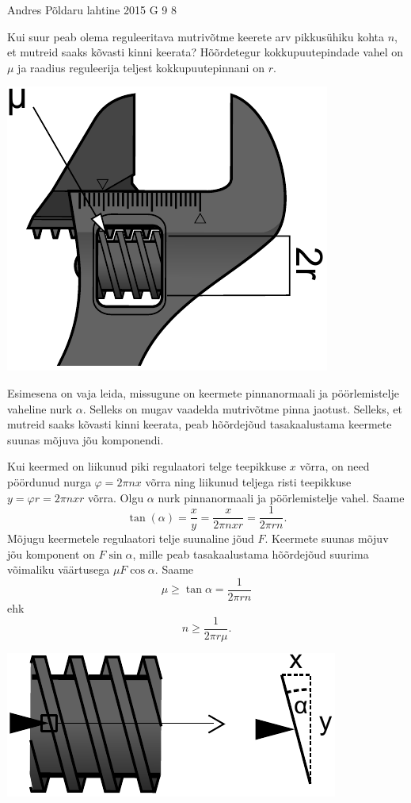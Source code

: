 {Andres Põldaru} %
{lahtine} %
{2015} %
{G 9} %
{8} %
{
\ifStatement
Kui suur peab olema reguleeritava mutrivõtme keerete arv pikkusühiku kohta $n$, et mutreid saaks kõvasti kinni keerata? Hõõrdetegur kokkupuutepindade vahel on $\mu$ ja raadius reguleerija teljest kokkupuutepinnani on $r$.
\begin{center}%
\includegraphics[width=0.4\linewidth]{2015-lahg-09-mutriv6ti_joonis}%
\end{center}
\fi


\ifHint
Esimesena on vaja leida, missugune on keermete pinnanormaali ja pöörlemistelje vaheline nurk $\alpha$. Selleks on mugav vaadelda mutrivõtme pinna jaotust. Selleks, et mutreid saaks kõvasti kinni keerata, peab hõõrdejõud tasakaalustama keermete suunas mõjuva jõu komponendi.
\fi


\ifSolution
Kui keermed on liikunud piki regulaatori telge teepikkuse $x$ võrra, on need pöördunud nurga $\varphi=2\pi nx$ võrra ning liikunud teljega risti teepikkuse $y=\varphi r=2\pi nxr$ võrra. Olgu $\alpha$ nurk pinnanormaali ja pöörlemistelje vahel. Saame 
\[
\tan(\alpha)=\frac{x}{y}=\frac{x}{2\pi nxr}=\frac{1}{2\pi rn}.
\]
Mõjugu keermetele regulaatori telje suunaline jõud $F$. Keermete suunas mõjuv jõu komponent on $F\sin\alpha$, mille peab tasakaalustama hõõrdejõud suurima võimaliku väärtusega $\mu F\cos\alpha$. Saame 
\[
\mu\geq\tan\alpha=\frac{1}{2\pi rn}
\]
ehk
\[
n\ge\frac{1}{2\pi r\mu}.
\]

\begin{center}
\includegraphics[width=0.5\linewidth]{2015-lahg-09-mutriv6ti_lahendus.pdf}
\end{center}
\fi


}

